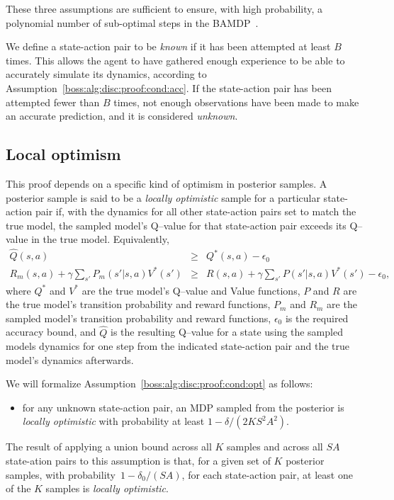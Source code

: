 These three assumptions are sufficient to ensure, with high probability, a polynomial number of sub-optimal steps in the BAMDP~\cite{lihong09abr2}.

We define a state-action pair to be \emph{known} if it has been attempted at least $B$ times. This allows the agent to have gathered enough experience to be able to accurately simulate its dynamics, according to Assumption~\ref{boss:alg:disc:proof:cond:acc}. If the state-action pair has been attempted fewer than $B$ times, not enough observations have been made to make an accurate prediction, and it is considered \emph{unknown}.

\subsection{Local optimism}
\label{boss:alg:disc:proof:opt}
This proof depends on a specific kind of optimism in posterior samples. A posterior sample is said to be a \emph{locally optimistic} sample for a particular state-action pair if, with the dynamics for all other state-action pairs set to match the true model, the sampled model's Q--value for that state-action pair exceeds its Q--value in the true model. Equivalently,
\begin{eqnarray}
\label{boss:alg:disc:proof:opt}\hat Q(s,a) &\geq& Q^*(s, a) - \epsilon_0\\
R_m(s,a) +\gamma \sum_{s'} P_m(s'|s,a) V^*(s')&\geq&R(s,a) +\gamma \sum_{s'} P(s'|s,a) V^*(s') - \epsilon_0,
\end{eqnarray}
where $Q^*$ and $V^*$ are the true model's Q--value and Value functions, $P$ and $R$ are the true model's transition probability and reward functions, $P_m$ and $R_m$ are the sampled model's transition probability and reward functions, $\epsilon_0$ is the required accuracy bound, and $\hat Q$ is the resulting Q--value for a state using the sampled models dynamics for one step from the indicated state-action pair and the true model's dynamics afterwards.

We will formalize Assumption~\ref{boss:alg:disc:proof:cond:opt} as follows:
\begin{itemize}
\item for any unknown state-action pair, an MDP sampled from the posterior is \emph{locally optimistic} with probability at least $1-\delta/(2 K S^2 A^2)$.
\end{itemize}

The result of applying a union bound across all $K$ samples and across all $S A$ state-ation pairs to this assumption is that, for a given set of $K$ posterior samples, with probability~$1-\delta_0/(S A)$, for each state-action pair, at least one of the $K$ samples is \emph{locally optimistic}.

